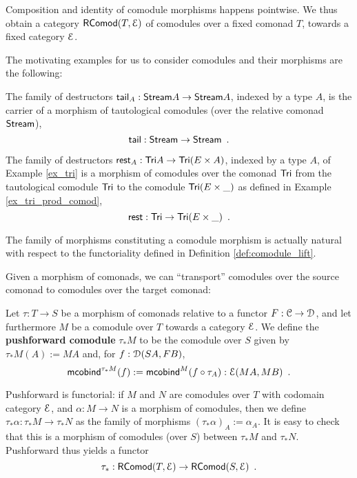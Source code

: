 \documentclass[a4paper,USenglish]{lipics}
\newcommand{\fat}[1]{\textbf{#1}}
\begin{document}
\noindent
Composition and identity of comodule morphisms happens pointwise. We thus obtain a category $\RComod(T,\E)$
 of comodules
over a fixed comonad $T$, towards a fixed category $\E$.

The motivating examples for us to consider comodules and their morphisms are the following:

 \begin{example}\label{ex_tail_comodule}
  The family of destructors $\stail_A : \stream A \to \stream A$, indexed by a type $A$, is the carrier of a morphism of tautological comodules (over the relative comonad $\stream$),
  \[ \stail : \stream \to \stream \enspace . \]
 \end{example}

\begin{example}\label{ex:tail_comodule}
 The family of destructors $\tail_A : \Tri A \to \Tri(E\times A)$, indexed by a type $A$, of Example \ref{ex_tri} is a morphism of comodules over the comonad $\Tri$ 
  from the tautological comodule  $\Tri$ to the comodule $\Tri(E\times \_)$ as defined in Example \ref{ex_tri_prod_comod},
  \[ \tail : \Tri \to \Tri(E\times \_) \enspace . \]
\end{example}




\begin{rem}
  The family of morphisms constituting a comodule morphism is actually natural with respect to the functoriality 
  defined in Definition \ref{def:comodule_lift}.
\end{rem}

Given a morphism of comonads, we can \enquote{transport} comodules over the source comonad to comodules over the target comonad:


\begin{definition}
\label{def:pushforward_comodule} 
  Let $\tau : T\to S$ be a morphism of comonads relative to a functor $F : \C \to \D$, and let furthermore $M$ be a 
  comodule over $T$ towards a category $\E$. We define the \fat{pushforward comodule} $\tau_*M$ to be the comodule over $S$ given by
  $  \tau_*M(A) := MA $
  and, for $f : \D(SA,FB)$,
   \[ \mcobind^{\tau_*M}(f) := \mcobind^M(\comp{\tau_A}{f}) : \E(MA,MB) \enspace . \]
   
  \noindent
  Pushforward is functorial: if $M$ and $N$ are comodules over $T$ with codomain category $\E$, and $\alpha : M\to N$ is 
    a morphism of comodules, then we define 
     $\tau_*\alpha : \tau_*M \to \tau_*N$
    as the family of morphisms
     $ (\tau_*\alpha)_A := \alpha_A$.
  It is easy to check that this is a morphism of comodules (over $S$) between $\tau_*M$ and $\tau_*N$.
  Pushforward thus yields a functor \[\tau_*:\RComod(T,\E) \to \RComod(S,\E) \enspace . \]
\end{definition}
\end{document}
